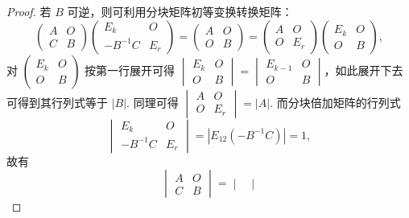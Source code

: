 \begin{enumerate}
\begin{proof}
              若 $B$ 可逆，则可利用分块矩阵初等变换转换矩阵：
              \[
                  \begin{pmatrix}
                      A & O \\ C & B
                  \end{pmatrix} \begin{pmatrix}
                      E_k & O \\ -B^{-1} C & E_r
                  \end{pmatrix} = \begin{pmatrix}
                      A & O \\ O & B
                  \end{pmatrix} = \begin{pmatrix}
                      A & O \\ O & E_r
                  \end{pmatrix} \begin{pmatrix}
                      E_k & O \\ O & B
                  \end{pmatrix},
              \]
              对 $\begin{pmatrix}
                      E_k & O \\ O & B
                  \end{pmatrix}$ 按第一行展开可得 $\begin{vmatrix}
                      E_k & O \\ O & B
                  \end{vmatrix} = \begin{vmatrix}
                      E_{k-1} & O \\ O & B
                  \end{vmatrix}$，如此展开下去可得到其行列式等于 $|B|$. 同理可得 $\begin{vmatrix}
                      A & O \\ O & E_r
                  \end{vmatrix} = |A|$. 而分块倍加矩阵的行列式
              \[
                  \begin{vmatrix}
                      E_k & O \\ -B^{-1} C & E_r
                  \end{vmatrix} = |E_{12}(-B^{-1}C)| = 1,
              \]
              故有
              \[
                  \begin{vmatrix}
                      A & O \\ C & B
                  \end{vmatrix} = \begin{vmatrix}

\end{vmatrix}\]
\end{proof}
\end{enumerate}
